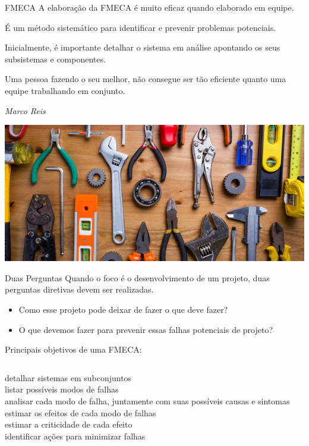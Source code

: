 \documentclass[aspectratio=169]{beamer}
\begin{document}
\begin{frame}[t]{FMECA}
    A elaboração da FMECA é muito eficaz quando elaborado em equipe.

    É um método sistemático para identificar e prevenir problemas potenciais.

    Inicialmente, é importante detalhar o sistema em análise apontando os seus subsistemas e componentes.
    
    \setlength{}
    \epigraph{Uma pessoa fazendo o seu melhor, não consegue ser tão eficiente quanto uma equipe trabalhando em conjunto.}{\textit{Marco Reis}}

    \includegraphics[width=1\textwidth, trim={0 1.8cm 0 0},clip]{tools}
    \raggedleft
\end{frame}
\begin{frame}[t]{Duas Perguntas}
    Quando o foco é o desenvolvimento de um projeto, duas perguntas diretivas devem ser realizadas.
    \newline
    \begin{itemize}
        \item Como esse projeto pode deixar de fazer o que deve fazer?
        \item O que devemos fazer para prevenir essas falhas potenciais de projeto?
    \end{itemize}
    \hfill

    Principais objetivos de uma FMECA:
    \newline
    \begin{columns}[t]
            detalhar sistemas em subconjuntos\\
            listar possíveis modos de falhas\\
            analisar cada modo de falha, juntamente com suas possíveis causas e sintomas
            estimar os efeitos de cada modo de falhas\\
            estimar a criticidade de cada efeito\\
            identificar ações para minimizar falhas
    \end{columns}
\end{frame}
\end{document}
